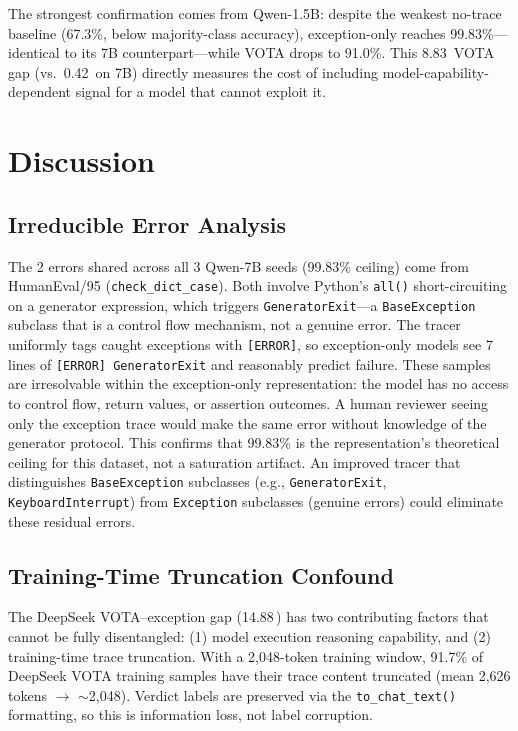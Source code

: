 \documentclass[11pt]{article}
\newcommand{\pp}{\,\text{pp}}
\begin{document}
The strongest confirmation comes from Qwen-1.5B: despite the weakest no-trace baseline (67.3\%, below majority-class accuracy), exception-only reaches 99.83\%---identical to its 7B counterpart---while VOTA drops to 91.0\%.
This 8.83\pp{} VOTA gap (vs.\ 0.42\pp{} on 7B) directly measures the cost of including model-capability-dependent signal for a model that cannot exploit it.

\section{Discussion}
\label{sec:discussion}

\subsection{Irreducible Error Analysis}
\label{sec:irreducible}

The 2 errors shared across all 3 Qwen-7B seeds (99.83\% ceiling) come from HumanEval/95 (\texttt{check\_dict\_case}).
Both involve Python's \texttt{all()} short-circuiting on a generator expression, which triggers \texttt{GeneratorExit}---a \texttt{BaseException} subclass that is a control flow mechanism, not a genuine error.
The tracer uniformly tags caught exceptions with \texttt{[ERROR]}, so exception-only models see 7 lines of \texttt{[ERROR] GeneratorExit} and reasonably predict failure.
These samples are irresolvable within the exception-only representation: the model has no access to control flow, return values, or assertion outcomes.
A human reviewer seeing only the exception trace would make the same error without knowledge of the generator protocol.
This confirms that 99.83\% is the representation's theoretical ceiling for this dataset, not a saturation artifact.
An improved tracer that distinguishes \texttt{BaseException} subclasses (e.g., \texttt{GeneratorExit}, \texttt{KeyboardInterrupt}) from \texttt{Exception} subclasses (genuine errors) could eliminate these residual errors.

\subsection{Training-Time Truncation Confound}
\label{sec:truncation}

The DeepSeek VOTA--exception gap (14.88\pp) has two contributing factors that cannot be fully disentangled: (1) model execution reasoning capability, and (2) training-time trace truncation.
With a 2{,}048-token training window, 91.7\% of DeepSeek VOTA training samples have their trace content truncated (mean 2{,}626 tokens $\rightarrow$ ${\sim}$2{,}048).
Verdict labels are preserved via the \texttt{to\_chat\_text()} formatting, so this is information loss, not label corruption.
\end{document}
